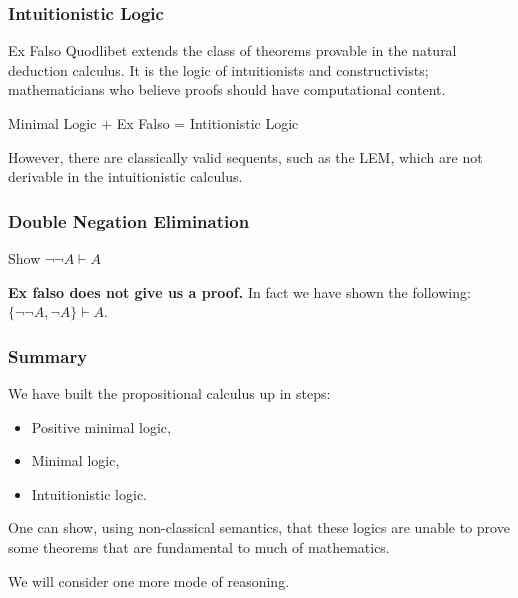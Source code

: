 \documentclass{beamer}
\begin{document}
\begin{frame}
  \frametitle{Intuitionistic Logic}

	Ex Falso Quodlibet extends the class of theorems provable in the natural deduction calculus. It is the logic of intuitionists and constructivists; mathematicians who believe proofs should have computational content.
	
	\begin{center}
  		Minimal Logic + Ex Falso = Intitionistic Logic
	\end{center}

	However, there are classically valid sequents, such as the LEM, which are not derivable in the intuitionistic calculus. 

	\vspace{4cm}

\end{frame}

\begin{frame}
	\frametitle{Double Negation Elimination}
	
	Show $\lnot\lnot A \vdash A$ 
	\vspace{50mm}
	
	\pause
	
	{\bf Ex falso does not give us a proof.} In fact we have shown the following: $\{\lnot\lnot A, \lnot A\} \vdash A$.
	
\end{frame}



\begin{frame}
	\frametitle{Summary}

	We have built the propositional calculus up in steps: 

	\begin{itemize}
		\item Positive minimal logic, 
		\item Minimal logic, 
		\item Intuitionistic logic.
	\end{itemize}

	\vspace{5mm}

	One can show, using non-classical semantics, that these logics are unable to prove some theorems that are fundamental to much of mathematics. 

	\vspace{0.3cm}

	We will consider one more mode of reasoning. %

\end{frame}
\end{document}
